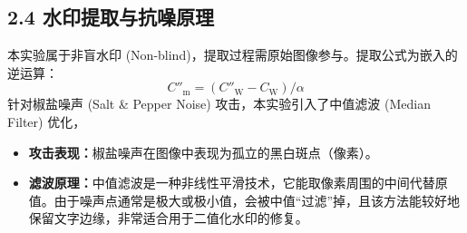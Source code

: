 \documentclass[12pt, a4paper]{article}
\begin{document}
\subsection*{2.4 水印提取与抗噪原理}
本实验属于非盲水印 (Non-blind)，提取过程需原始图像参与。提取公式为嵌入的逆运算：
\begin{equation}
    C''_{\text{m}} = (C''_{\text{W}} - C_{\text{W}}) / \alpha
\end{equation}
针对椒盐噪声 (Salt \& Pepper Noise) 攻击，本实验引入了中值滤波 (Median Filter) 优化，
\begin{itemize}
    \item \textbf{攻击表现：}椒盐噪声在图像中表现为孤立的黑白斑点（像素）。
    \item \textbf{滤波原理：}中值滤波是一种非线性平滑技术，它能取像素周围的中间代替原值。由于噪声点通常是极大或极小值，会被中值“过滤”掉，且该方法能较好地保留文字边缘，非常适合用于二值化水印的修复。
\end{itemize}

\end{document}
